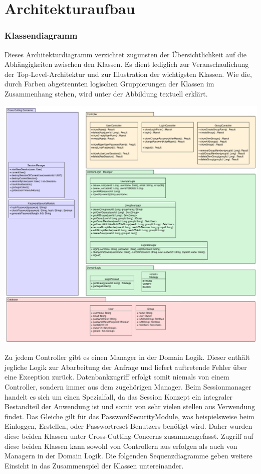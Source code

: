 \documentclass[12pt,DIV14,BCOR10mm,a4paper,twoside,parskip=half-,headsepline,headinclude,english,ngerman,bibliography=totocnumbered]{scrreprt}
\begin{document}
\tableofcontents  %

\chapter{Architekturaufbau}
\subsection{Klassendiagramm}
Dieses Architekturdiagramm verzichtet zugunsten der Übersichtlichkeit auf die Abhängigkeiten zwischen den Klassen. Es dient lediglich zur Veranschaulichung der Top-Level-Architektur und zur Illustration der wichtigsten Klassen. Wie die, durch Farben abgetrennten logischen Gruppierungen der Klassen im Zusammenhang stehen, wird unter der Abbildung textuell erklärt.

\includegraphics[width=0.73\paperwidth]{resources/class_diagram.png}

Zu jedem Controller gibt es einen Manager in der Domain Logik. Dieser enthält jegliche Logik zur Abarbeitung der Anfrage und liefert auftretende Fehler über eine Exception zurück. Datenbankzugriff erfolgt somit niemals von einem Controller, sondern immer aus dem zugehörigen Manager. Beim Sessionmanager handelt es sich um einen Spezialfall, da das Session Konzept ein integraler Bestandteil der Anwendung ist und somit von sehr vielen stellen aus Verwendung findet. Das Gleiche gilt für das PasswordSecurityModule, was beispielsweise beim Einloggen, Erstellen, oder Passwortreset Benutzers benötigt wird. Daher wurden diese beiden Klassen unter Cross-Cutting-Concerns zusammengefasst. Zugriff auf diese beiden Klassen kann sowohl von Controllern aus erfolgen als auch von Managern in der Domain Logik. Die folgenden Sequenzdiagramme geben weitere Einsicht in das Zusammenspiel der Klassen untereinander.
\end{document}
